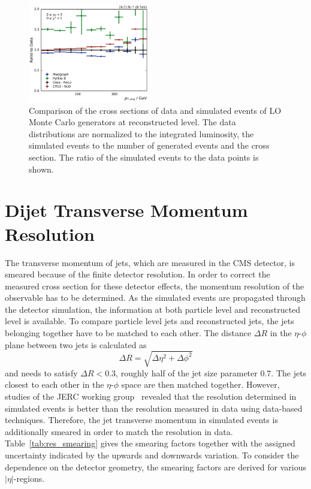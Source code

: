 \begin{figure}[htbp]
    \includegraphics[width=0.47\textwidth]{figures/measurement/ratio_reco_to_data_yb2ys0.pdf}
    \caption[Comparison of data with simulated events]{Comparison of the cross
        sections of data and simulated events of LO Monte Carlo generators at
        reconstructed level. The data distributions are normalized to the
        integrated luminosity, the simulated events to the number of generated
        events and the cross section. The ratio of the simulated events to the data
        points is shown.}
    \label{fig:ratio_recotodata}
\end{figure}


\section{Dijet Transverse Momentum  Resolution}
\label{sec:resolution}

The transverse momentum of jets, which are measured in the CMS detector, is
smeared because of the finite detector resolution. In order to correct the
measured cross section for these detector effects, the momentum resolution of
the observable has to be determined. As the simulated events are propagated
through the detector simulation, the information at both particle level and
reconstructed level is available. To compare particle level jets and
reconstructed jets, the jets belonging together have to be matched to each
other. The distance $\Delta R$ in the $\eta$-$\phi$ plane between two jets is
calculated as
%
\begin{equation}
\Delta R = \sqrt{\Delta \eta^2 + \Delta \phi^2}
\end{equation}
%
and needs to satisfy $\Delta R < 0.3$, roughly half of the jet size parameter
$0.7$. The jets closest to each other in the $\eta$-$\phi$ space are then matched together.
However, studies of the \textsc{JERC} working group~\cite{jetmet:resolution}
revealed that the resolution determined in simulated events is better than the
resolution measured in data using data-based techniques. Therefore, the jet
transverse momentum in simulated events is additionally smeared in order to
match the resolution in data.  Table~\ref{tab:res_smearing} gives the smearing
factors together with the assigned uncertainty indicated by the upwards and
downwards variation. To consider the dependence on the detector geometry, the
smearing factors are derived for various $|\eta|$-regions.

